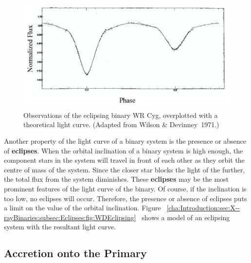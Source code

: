 \begin{figure}[!htb]
\begin{center}
\includegraphics[width=15.0cm]{WDEclipsing}
\caption{%
Observations of the eclipsing binary WR Cyg, overplotted with a theoretical light curve. %
(Adapted from Wilson \& Devinney~1971.)%
}
\label{cha:Introduction:sec:X--rayBinaries:subsec:Eclipses:fig:WDEclipsing}
\end{center}
\end{figure}
\nocite{WilsonDevinney:1971} %



Another property of the light curve of a binary system is the presence
or absence of \textbf{eclipses}. When the orbital inclination of a binary system is high enough, the component stars in the system will travel in front of each other as they orbit the centre
of mass of the system. Since the closer star blocks the light of the
further, the total flux from the system diminishes. These \textbf{eclipses} may be the most prominent features of the light curve of the
binary. Of course, if the inclination is too low, no eclipses will
occur. Therefore, the presence or absence of eclipses puts a limit on
the value of the orbital inclination. Figure~%
\vref{cha:Introduction:sec:X--rayBinaries:subsec:Eclipses:fig:WDEclipsing}%
\ shows a model of an eclipsing system with the resultant light
curve. %


\subsection{Accretion onto the Primary}
\label{cha:Introduction:sec:BinaryStarSystems:subsec:Accretion}


